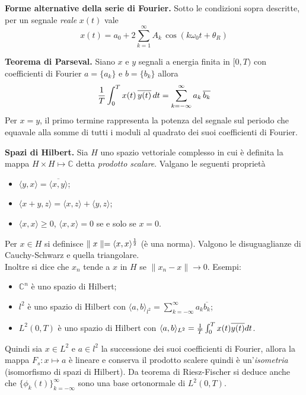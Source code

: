 \documentclass[a4paper,portrait,12pt]{article}
\theoremstyle{definition}
\begin{document}
\textbf{Forme alternative della serie di Fourier.} Sotto le condizioni sopra descritte, per un segnale 
\textit{reale} $x(t)$ vale
\begin{equation}
x(t) = a_0 + 2\sum_{k=1}^{\infty}A_k\,\cos(k\omega_0t+\theta_R)
\end{equation}
\bigskip

\textbf{Teorema di Parseval.} Siano $x$ e $y$ segnali a energia finita in $[0,T)$ con 
coefficienti di Fourier $a = \{a_k\}$ e $b = \{b_k\}$ allora
\begin{equation}
{1 \over T}\int_0^Tx(t)\,\overline{y(t)}\,dt = \sum_{k=-\infty}^{\infty}a_k\,\overline{b_k}
\end{equation}
Per $x = y$, il primo termine rappresenta la potenza del segnale sul periodo che equavale alla somme di 
tutti i moduli al quadrato dei suoi coefficienti di Fourier.
\bigskip

\textbf{Spazi di Hilbert.} Sia $H$ uno spazio vettoriale complesso in cui è definita la mappa $H \times H
\mapsto \mathbb{C}$ detta \textit{prodotto scalare}. Valgano le seguenti proprietà
\begin{itemize}
\item $\langle y,x \rangle = \overline{\langle x,y \rangle}$;
\item $\langle x+y,z \rangle = \langle x,z \rangle + \langle y,z \rangle$;
\item $\langle x,x \rangle \ge 0$, $\langle x,x \rangle = 0$ se e solo se $x = 0$.
\end{itemize}
Per $x \in H$ si definisce $\parallel x \parallel = \langle x,x \rangle^{1 \over 2}$ (è una norma). Valgono
le disuguaglianze di Cauchy-Schwarz e quella triangolare.\\
Inoltre si dice che $x_n$ tende a $x$ in $H$ se $\parallel x_n - x \parallel \to 0$. Esempi:
\begin{itemize}
\item $\mathbb{C}^n$ è uno spazio di Hilbert;
\item $l^2$ è uno spazio di Hilbert con $\langle a,b \rangle_{l^2} = \sum_{k=-\infty}^{\infty} a_k 
	\overline{b_k}$;
\item $L^2(0,T)$ è uno spazio di Hilbert con $\langle a,b \rangle_{L^2} = {1 \over T} \int_0^T x(t) 
	\overline{y(t)}dt$.
\end{itemize}
Quindi sia $x \in L^2$ e $a \in l^2$ la successione dei suoi coefficienti di Fourier, allora la mappa 
$F_s : x \mapsto a$ è lineare e conserva il prodotto scalere quindi è un'\textit{isometria} (isomorfismo
di spazi di Hilbert). Da teorema di Riesz-Fischer si deduce anche che $\{\phi_k (t)\}_{k=-\infty}^{\infty}$
sono una base ortonormale di $L^2(0,T)$.  
\bigskip
\end{document}
